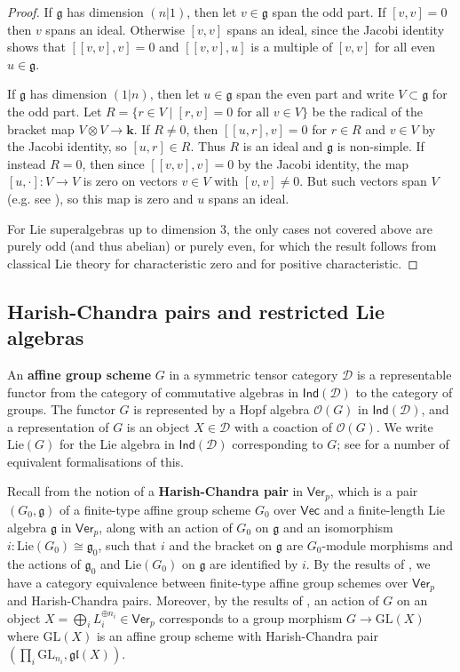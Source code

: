 \documentclass[11pt,a4paper,reqno]{amsart}
\theoremstyle{definition}
\newcommand{\bk}{\mathbf{k}}
\newcommand{\cD}{\mathcal{D}}
\numberwithin{equation}{section}
\newcommand{\Ver}{\mathsf{Ver}}
\newcommand{\cO}{\mathcal{O}}
\newcommand{\fg}{\mathfrak{g}}
\newcommand{\fgl}{\mathfrak{gl}}
\newcommand{\Lie}{\mathrm{Lie}}
\newcommand{\Vecc}{\mathsf{Vec}}
\newcommand{\Indd}{\mathsf{Ind}}
\newcommand{\GL}{\mathrm{GL}}
\begin{document}
\begin{proof}
If $\fg$ has dimension $(n|1)$, then let $v\in\fg$ span the odd part. If $[v,v]=0$ then $v$ spans an ideal. Otherwise $[v,v]$ spans an ideal, since the Jacobi identity shows that $[[v,v],v]=0$ and $[[v,v],u]$ is a multiple of $[v,v]$ for all even $u\in\fg$.

If $\fg$ has dimension $(1|n)$, then let $u\in\fg$ span the even part and write $V\subset\fg$ for the odd part. Let $R=\{r\in V\mid [r,v]=0\text{ for all }v\in V\}$ be the radical of the bracket map $V\otimes V\to\bk$. If $R\neq0$, then $[[u,r],v]=0$ for $r\in R$ and $v\in V$ by the Jacobi identity, so $[u,r]\in R$. Thus $R$ is an ideal and $\fg$ is non-simple. If instead $R=0$, then since $[[v,v],v]=0$ by the Jacobi identity, the map $[u,\cdot]:V\to V$ is zero on vectors $v\in V$ with $[v,v]\neq0$. But such vectors span $V$ (e.g. see \cite[Theorem~6.9]{Jac}), so this map is zero and $u$ spans an ideal.

For Lie superalgebras up to dimension 3, the only cases not covered above are purely odd (and thus abelian) or purely even, for which the result follows from classical Lie theory for characteristic zero and \cite{PS} for positive characteristic.
\end{proof}

\subsection{Harish-Chandra pairs and restricted Lie algebras} An \textbf{affine group scheme} $G$ in a symmetric tensor category $\cD$ is a representable functor from the category of commutative algebras in $\Indd(\cD)$ to the category of groups. The functor $G$ is represented by a Hopf algebra $\cO(G)$ in $\Indd(\cD)$, and a representation of $G$ is an object $X\in\cD$ with a coaction of $\cO(G)$. We write $\Lie(G)$ for the Lie algebra in $\Indd(\cD)$ corresponding to $G$; see \cite{BP} for a number of equivalent formalisations of this.

Recall from \cite{Ve1} the notion of a \textbf{Harish-Chandra pair} in $\Ver_p$, which is a pair $(G_0,\fg)$ of a finite-type affine group scheme $G_0$ over $\Vecc$ and a finite-length Lie algebra $\fg$ in $\Ver_p$, along with an action of $G_0$ on $\fg$ and an isomorphism $i:\Lie(G_0)\cong\fg_0$, such that $i$ and the bracket on $\fg$ are $G_0$-module morphisms and the actions of $\fg_0$ and $\Lie(G_0)$ on $\fg$ are identified by $i$. By the results of \cite{Ve1}, we have a category equivalence between finite-type affine group schemes over $\Ver_p$ and Harish-Chandra pairs. Moreover, by the results of \cite{Ve2}, an action of $G$ on an object $X=\bigoplus_i L_i^{\oplus n_i}\in\Ver_p$ corresponds to a group morphism $G\to\GL(X)$ where $\GL(X)$ is an affine group scheme with Harish-Chandra pair $(\prod_i\GL_{n_i},\fgl(X))$.
\end{document}
